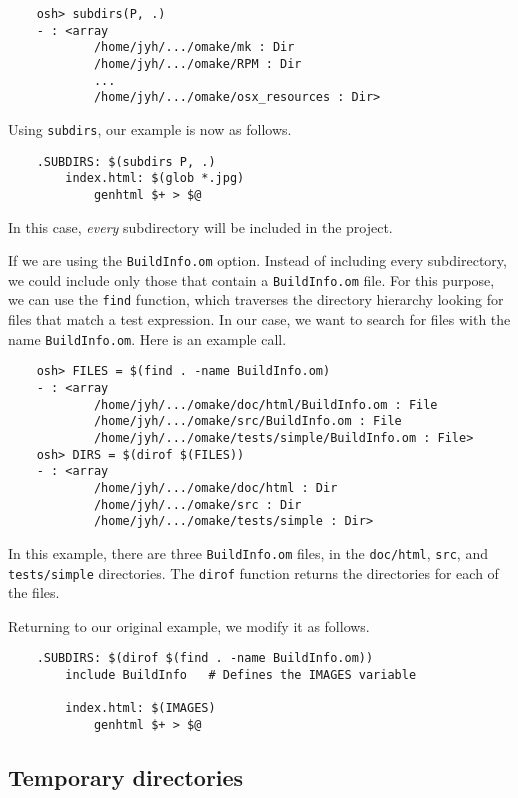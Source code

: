 \begin{verbatim}
    osh> subdirs(P, .)
    - : <array
            /home/jyh/.../omake/mk : Dir
            /home/jyh/.../omake/RPM : Dir
            ...
            /home/jyh/.../omake/osx_resources : Dir>
\end{verbatim}

Using \verb+subdirs+, our example is now as follows.

\begin{verbatim}
    .SUBDIRS: $(subdirs P, .)
        index.html: $(glob *.jpg)
            genhtml $+ > $@
\end{verbatim}

In this case, \emph{every} subdirectory will be included in the project.

If we are using the \verb+BuildInfo.om+ option.  Instead of including every subdirectory, we could
include only those that contain a \verb+BuildInfo.om+ file.  For this purpose, we can use the
\verb+find+ function, which traverses the directory hierarchy looking for files that match a test
expression.  In our case, we want to search for files with the name \verb+BuildInfo.om+.
Here is an example call.

\begin{verbatim}
    osh> FILES = $(find . -name BuildInfo.om)
    - : <array
            /home/jyh/.../omake/doc/html/BuildInfo.om : File
            /home/jyh/.../omake/src/BuildInfo.om : File
            /home/jyh/.../omake/tests/simple/BuildInfo.om : File>
    osh> DIRS = $(dirof $(FILES))
    - : <array
            /home/jyh/.../omake/doc/html : Dir
            /home/jyh/.../omake/src : Dir
            /home/jyh/.../omake/tests/simple : Dir>
\end{verbatim}

In this example, there are three \verb+BuildInfo.om+ files, in the \verb+doc/html+, \verb+src+, and
\verb+tests/simple+ directories.  The \verb+dirof+ function returns the directories for each of the
files.

Returning to our original example, we modify it as follows.

\begin{verbatim}
    .SUBDIRS: $(dirof $(find . -name BuildInfo.om))
        include BuildInfo   # Defines the IMAGES variable

        index.html: $(IMAGES)
            genhtml $+ > $@
\end{verbatim}

\subsection{Temporary directories}

